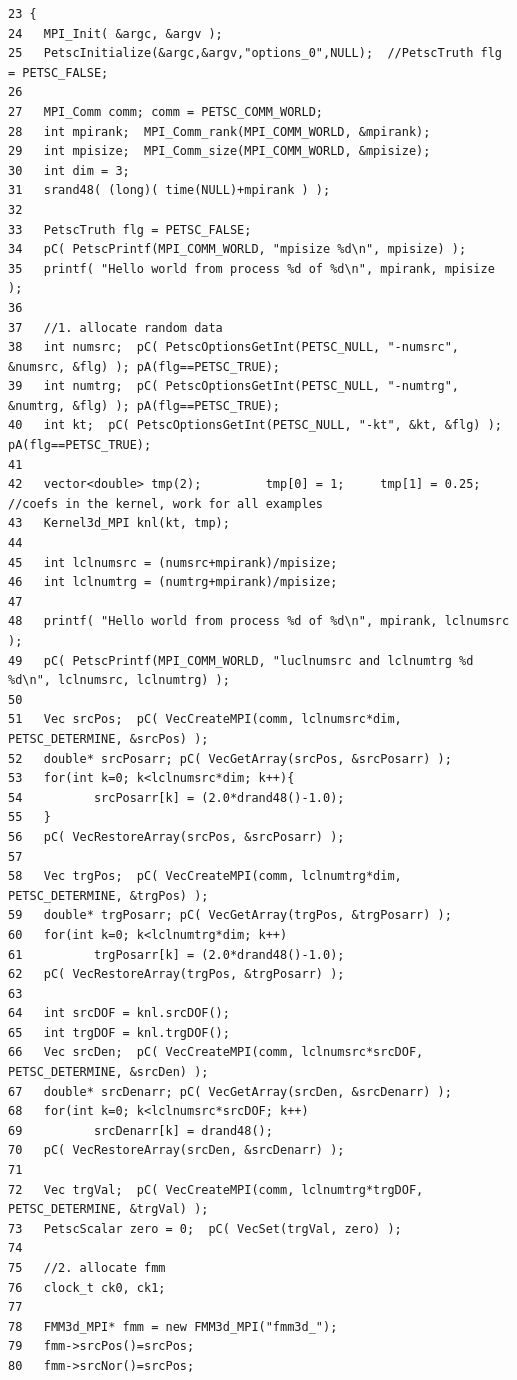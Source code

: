 \footnotesize\begin{verbatim}23 {
24   MPI_Init( &argc, &argv );
25   PetscInitialize(&argc,&argv,"options_0",NULL);  //PetscTruth flg = PETSC_FALSE;
26   
27   MPI_Comm comm; comm = PETSC_COMM_WORLD;
28   int mpirank;  MPI_Comm_rank(MPI_COMM_WORLD, &mpirank);
29   int mpisize;  MPI_Comm_size(MPI_COMM_WORLD, &mpisize);
30   int dim = 3;
31   srand48( (long)( time(NULL)+mpirank ) );
32   
33   PetscTruth flg = PETSC_FALSE;
34   pC( PetscPrintf(MPI_COMM_WORLD, "mpisize %d\n", mpisize) );
35   printf( "Hello world from process %d of %d\n", mpirank, mpisize );
36   
37   //1. allocate random data
38   int numsrc;  pC( PetscOptionsGetInt(PETSC_NULL, "-numsrc", &numsrc, &flg) ); pA(flg==PETSC_TRUE);
39   int numtrg;  pC( PetscOptionsGetInt(PETSC_NULL, "-numtrg", &numtrg, &flg) ); pA(flg==PETSC_TRUE);
40   int kt;  pC( PetscOptionsGetInt(PETSC_NULL, "-kt", &kt, &flg) ); pA(flg==PETSC_TRUE);
41   
42   vector<double> tmp(2);         tmp[0] = 1;     tmp[1] = 0.25; //coefs in the kernel, work for all examples
43   Kernel3d_MPI knl(kt, tmp);
44   
45   int lclnumsrc = (numsrc+mpirank)/mpisize;
46   int lclnumtrg = (numtrg+mpirank)/mpisize;
47 
48   printf( "Hello world from process %d of %d\n", mpirank, lclnumsrc );
49   pC( PetscPrintf(MPI_COMM_WORLD, "luclnumsrc and lclnumtrg %d %d\n", lclnumsrc, lclnumtrg) );
50   
51   Vec srcPos;  pC( VecCreateMPI(comm, lclnumsrc*dim, PETSC_DETERMINE, &srcPos) );
52   double* srcPosarr; pC( VecGetArray(srcPos, &srcPosarr) );
53   for(int k=0; k<lclnumsrc*dim; k++){
54          srcPosarr[k] = (2.0*drand48()-1.0);
55   }
56   pC( VecRestoreArray(srcPos, &srcPosarr) );
57   
58   Vec trgPos;  pC( VecCreateMPI(comm, lclnumtrg*dim, PETSC_DETERMINE, &trgPos) );
59   double* trgPosarr; pC( VecGetArray(trgPos, &trgPosarr) );
60   for(int k=0; k<lclnumtrg*dim; k++)
61          trgPosarr[k] = (2.0*drand48()-1.0);
62   pC( VecRestoreArray(trgPos, &trgPosarr) );
63   
64   int srcDOF = knl.srcDOF();
65   int trgDOF = knl.trgDOF();
66   Vec srcDen;  pC( VecCreateMPI(comm, lclnumsrc*srcDOF, PETSC_DETERMINE, &srcDen) );
67   double* srcDenarr; pC( VecGetArray(srcDen, &srcDenarr) );
68   for(int k=0; k<lclnumsrc*srcDOF; k++)
69          srcDenarr[k] = drand48();
70   pC( VecRestoreArray(srcDen, &srcDenarr) );
71   
72   Vec trgVal;  pC( VecCreateMPI(comm, lclnumtrg*trgDOF, PETSC_DETERMINE, &trgVal) );
73   PetscScalar zero = 0;  pC( VecSet(trgVal, zero) );
74   
75   //2. allocate fmm 
76   clock_t ck0, ck1;
77   
78   FMM3d_MPI* fmm = new FMM3d_MPI("fmm3d_");
79   fmm->srcPos()=srcPos;
80   fmm->srcNor()=srcPos;

\end{verbatim}
